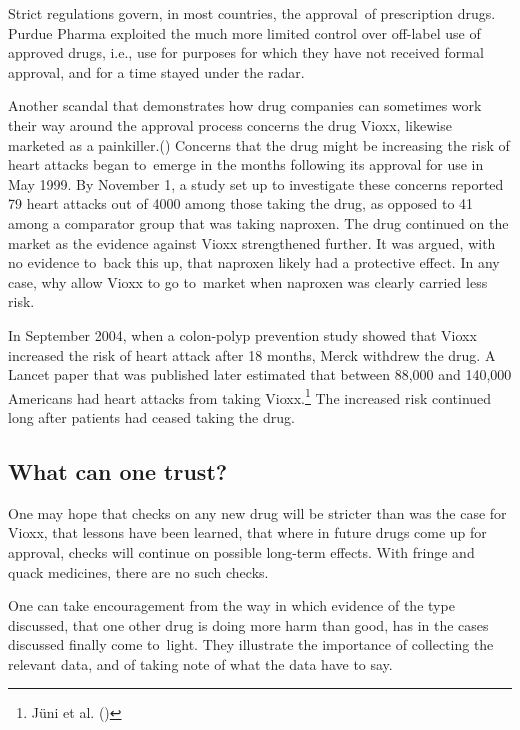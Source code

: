 \documentclass[
  10ptls,
  b5paper]{book}
\begin{document}
Strict regulations govern, in most countries, the approval~of
prescription drugs. Purdue Pharma exploited the much more
limited control over off-label use of approved drugs, i.e.,
use for purposes for which they have not received formal
approval, and for a time stayed under the radar.

Another scandal that demonstrates how drug companies can
sometimes work their way around the approval process
concerns the drug Vioxx, likewise marketed as a
painkiller.() Concerns that the
drug might be increasing the risk of heart attacks began
to~emerge in the months following its approval for use
in May 1999. By November 1, a study set up to investigate
these concerns reported 79 heart attacks out of 4000
among those taking the drug, as opposed to 41 among a
comparator group that was taking naproxen. The drug
continued on the market as the evidence against Vioxx
strengthened further. It was argued, with no evidence
to~back this up, that naproxen likely had a protective
effect. In any case, why allow Vioxx to go to~market
when naproxen was clearly carried less risk.

In September 2004,
when a colon-polyp prevention study showed that Vioxx
increased the risk of heart attack after 18 months,
Merck withdrew the drug. A Lancet paper that was
published later estimated that between 88,000 and
140,000 Americans had heart attacks from taking
Vioxx.\footnote{Jüni et al. ()} The increased risk continued
long after patients had ceased taking the drug.

\subsection*{What can one trust?}\label{what-can-one-trust}

One may hope that checks on any new drug will be
stricter than was the case for Vioxx, that lessons
have been learned, that where in future drugs come
up for approval, checks will continue on possible
long-term effects. With fringe and quack medicines,
there are no such checks.

One can take encouragement from the way in which
evidence of the type discussed, that one other drug
is doing more harm than good, has in the cases
discussed finally come to~light. They illustrate
the importance of collecting the relevant data, and
of taking note of what the data have to say.
\end{document}
